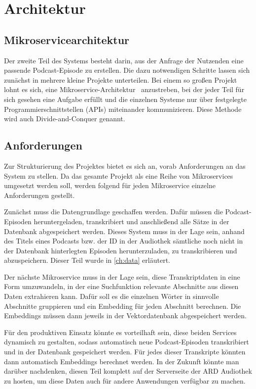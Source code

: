 \chapter{Architektur}\label{ch:method}

\section{Mikroservicearchitektur}

Der zweite Teil des Systems besteht darin, aus der Anfrage der Nutzenden eine passende Podcast-Episode zu erstellen.
Die dazu notwendigen Schritte lassen sich zunächst in mehrere kleine Projekte unterteilen.
Bei einem so großen Projekt lohnt es sich, eine Mikroservice-Architektur~\cite{fowler} anzustreben, bei der jeder Teil für sich gesehen eine Aufgabe erfüllt und die einzelnen Systeme nur über festgelegte Programmierschnittstellen (APIs) miteinander kommunizieren.
Diese Methode wird auch Divide-and-Conquer genannt.

\section{Anforderungen}

Zur Strukturierung des Projektes bietet es sich an, vorab Anforderungen an das System zu stellen.
Da das gesamte Projekt als eine Reihe von Mikroservices umgesetzt werden soll, werden folgend für jeden Mikroservice einzelne Anforderungen gestellt.

Zunächst muss die Datengrundlage geschaffen werden.
Dafür müssen die Podcast-Episoden heruntergeladen, transkribiert und anschließend alle Sätze in der Datenbank abgespeichert werden.
Dieses System muss in der Lage sein, anhand des Titels eines Podcasts bzw. der ID in der Audiothek sämtliche noch nicht in der Datenbank hinterlegten Episoden herunterzuladen, zu transkribieren und abzuspeichern.
Dieser Teil wurde in \autoref{ch:data} erläutert.

Der nächste Mikroservice muss in der Lage sein, diese Transkriptdaten in eine Form umzuwandeln, in der eine Suchfunktion relevante Abschnitte aus diesen Daten extrahieren kann.
Dafür soll es die einzelnen Wörter in sinnvolle Abschnitte gruppieren und ein Embedding für jeden Abschnitt berechnen.
Die Embeddings müssen dann jeweils in der Vektordatenbank abgespeichert werden.

Für den produktiven Einsatz könnte es vorteilhaft sein, diese beiden Services dynamisch zu gestalten, sodass automatisch neue Podcast-Episoden transkribiert und in der Datenbank gespeichert werden.
Für jedes dieser Transkripte könnten dann automatisch Embeddings berechnet werden.
In der Zukunft könnte man darüber nachdenken, diesen Teil komplett auf der Serverseite der ARD Audiothek zu hosten, um diese Daten auch für andere Anwendungen verfügbar zu machen.

